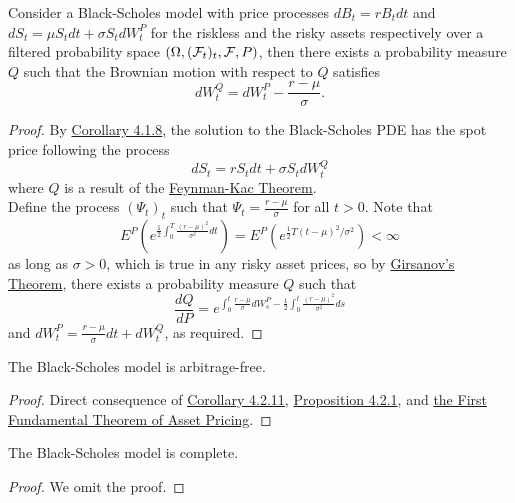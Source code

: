 \documentclass[11pt,fleqn]{book} %
\begin{document}
\begin{corollary} \label{cor:4211}
Consider a Black-Scholes model with price processes \(dB_t = rB_tdt\) and \(dS_t = \mu S_tdt + \sigma S_tdW_t^P\) for the riskless and the risky assets respectively over a filtered probability space \((\Omega, (\mathcal{F}_t)_t, \mathcal{F}, P)\), then there exists a probability measure \(Q\) such that the Brownian motion with respect to \(Q\) satisfies
\[
dW_t^Q = dW_t^P - \frac{r - \mu}{\sigma}.
\]
\end{corollary}
\begin{proof}
By \hyperref[cor:418]{Corollary 4.1.8}, the solution to the Black-Scholes PDE has the spot price following the process
\[
dS_t = rS_tdt + \sigma S_tdW_t^Q
\]
where \(Q\) is a result of the \hyperref[thm；416]{Feynman-Kac Theorem}. \\
\indent Define the process \((\Psi_t)_t\) such that \(\Psi_t = \frac{r - \mu}{\sigma}\) for all \(t > 0\). Note that
\[
E^P\left(e^{\frac12\int_0^T\frac{(r - \mu)^2}{\sigma^2}dt}\right) = E^P\left(e^{\frac12T(t - \mu)^2/\sigma^2}\right) < \infty
\]
as long as \(\sigma > 0\), which is true in any risky asset prices, so by \hyperref[thm:429]{Girsanov's Theorem}, there exists a probability measure \(Q\) such that
\[
\frac{dQ}{dP} = e^{\int_0^t\frac{r - \mu}{\sigma}dW_s^P - \frac12\int_0^t\frac{(r - \mu)^2}{\sigma^2}ds}
\]
and \(dW_t^P = \frac{r - \mu}{\sigma}dt + dW_t^Q\), as required.
\end{proof}

\begin{corollary} \label{cor:4212}
The Black-Scholes model is arbitrage-free.
\end{corollary}
\begin{proof} Direct consequence of \hyperref[cor:4211]{Corollary 4.2.11}, \hyperref[prop:421]{Proposition 4.2.1}, and \hyperref[thm:426]{the First Fundamental Theorem of Asset Pricing}.
\end{proof}

\begin{theorem} \label{thm:4213}
The Black-Scholes model is complete.
\end{theorem}
\begin{proof} We omit the proof. \end{proof}
\end{document}

